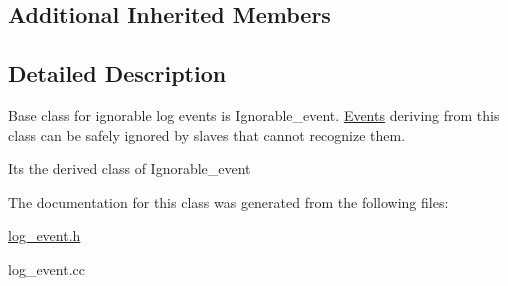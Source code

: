 \subsection*{Additional Inherited Members}


\subsection{Detailed Description}
Base class for ignorable log events is Ignorable\+\_\+event. \mbox{\hyperlink{classEvents}{Events}} deriving from this class can be safely ignored by slaves that cannot recognize them.

Its the derived class of Ignorable\+\_\+event 

The documentation for this class was generated from the following files\+:\begin{DoxyCompactItemize}
\item 
\mbox{\hyperlink{log__event_8h}{log\+\_\+event.\+h}}\item 
log\+\_\+event.\+cc\end{DoxyCompactItemize}

